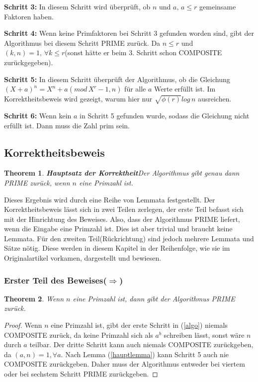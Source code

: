 \documentclass[12pt,oneside]{article}
\newtheorem{theorem}{Theorem}[section]
\theoremstyle{remark}
\theoremstyle{definition}
\begin{document}
\textbf{Schritt 3: }In diesem Schritt wird überprüft, ob $n$ und $a, \, a \leq r$ gemeinsame Faktoren haben. 

\textbf{Schritt 4: } Wenn keine Primfaktoren bei Schritt 3 gefunden worden sind, gibt der Algorithmus bei diesem Schritt PRIME zurück. Da $n \leq r$ und $(k,n) = 1, \, \forall k \leq r $(sonst hätte er beim 3. Schritt schon COMPOSITE zurückgegeben).

\textbf{Schritt 5: } In diesem Schritt überprüft der Algorithmus, ob die Gleichung $(X+a)^n = X^n + a (mod \, X^r - 1,n)$ für alle $a$ Werte erfüllt ist. Im Korrektheitsbeweis wird gezeigt, warum hier nur $\sqrt{\phi(r)} log \, n$ ausreichen.

\textbf{Schritt 6: } Wenn kein $a$ in Schritt 5 gefunden wurde, sodass die Gleichung nicht erfüllt ist. Dann muss die Zahl prim sein. 
\newpage

\subsection{Korrektheitsbeweis}

\begin{theorem}
\textbf{Hauptsatz der Korrektheit}\newline Der Algorithmus gibt genau dann PRIME zurück, wenn $n$ eine Primzahl ist.
\end{theorem}
Dieses Ergebnis wird durch eine Reihe von Lemmata festgestellt. Der Korrektheitsbeweis lässt sich in zwei Teilen zerlegen, der erste Teil befasst sich mit der Hinrichtung des Beweises. Also, dass der Algorithmus PRIME liefert, wenn die Eingabe eine Primzahl ist. Dies ist aber trivial und braucht keine Lemmata. Für den zweiten Teil(Rückrichtung) sind jedoch mehrere Lemmata und Sätze nötig. Diese werden in diesem Kapitel in der Reihenfolge, wie sie im Originalartikel vorkamen, dargestellt und bewiesen.

\subsubsection{Erster Teil des Beweises($\Rightarrow$)}
\begin{theorem}\label{hin_rich}
Wenn $n$ eine Primzahl ist, dann gibt der Algorithmus PRIME zurück.
\end{theorem}

\begin{proof}
Wenn $n$ eine Primzahl ist, gibt der erste Schritt in (\ref{algo}) niemals COMPOSITE zurück, da keine Primzahl sich als $a^b$ schreiben lässt, sonst wäre $n$ durch $a$ teilbar. Der dritte Schritt kann auch niemals COMPOSITE zurückgeben, da $(a,n) = 1, \forall a$. Nach Lemma (\ref{hauptlemma}) kann Schritt 5 auch nie COMPOSITE zurückgeben. Daher muss der Algorithmus entweder bei viertem oder bei sechstem Schritt PRIME zurückgeben.  
\end{proof}
\end{document}
